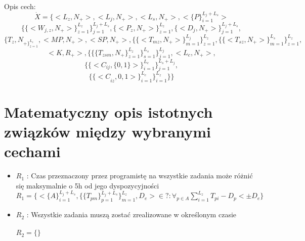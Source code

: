 \documentclass[a4paper,12pt]{extarticle}
\newcommand{\doubleLine}{
    \vspace*{20px} \\
}
\begin{document}
        Opis cech: $$\dot{X}=\{<L_z,N_+>,<L_j,N_+>,<L_s,N_+>,<\{P\}_{i=1}^{L_j + L_s}>$$
        $$\{\{<W_{j,z},N_+>\}_{z=1}^{L_z}\}_{j=1}^{L_j+L_s},\{<P_z,N_+>\}_{z=1}^{L_z},\{<D_j,N_+>\}_{j=1}^{L_j+L_s},$$
        $$\{T_z,N_{+\}_{z=1}^{L_z}},<MP,N_+>,<SP,N_+>,\{\{<T_{mz},N_+>\}_{m=1}^{L_j}\}_{z=1}^{L_z},\{\{<T_{sz},N_+>\}_{m=1}^{L_s}\}_{z=1}^{L_z},$$
        $$<K,R_+>,\{\{\{T_{zsm},N_+\}_{z=1}^{L_z}\}_{s=1}^{L_s}\}_{j=1}^{L_j},<L_c,N_+>,$$
        $$\{\{<C_{ij},\{0,1\}>\}_{i=1}^{L_c}\}_{j=1}^{L_s+L_j},$$
        $${\{\{<C}_{iz},{0,1}{>\}}_{i=1}^{L_c}\}_{i=1}^{L_z}\}\}$$

\section{Matematyczny opis istotnych związków między wybranymi cechami}
    \begin{itemize}
        \item $R_1$ : Czas przeznaczony przez programistę na wszystkie zadania może
            różnić się maksymalnie o 5h od jego dyspozycyjności \doubleLine
            $ R_1 = \{<\{A\}_{i=1}^{L_j + L_s}, \{\{T_{pm}\}_{p=1}^{L_j + L_s}\}_{m=1}^{L_z}, D_e> \in {?} : \forall_{p \in A} \sum_{i=1}^{L_z} T_{pi} - D_p < \pm D_e   \} $
        \item $R_2$ : Wszystkie zadania muszą zostać zrealizowane w określonym czasie
            \\~\\
            $ R_2 = \{  \}$
        
        
    \end{itemize}
\end{document}
